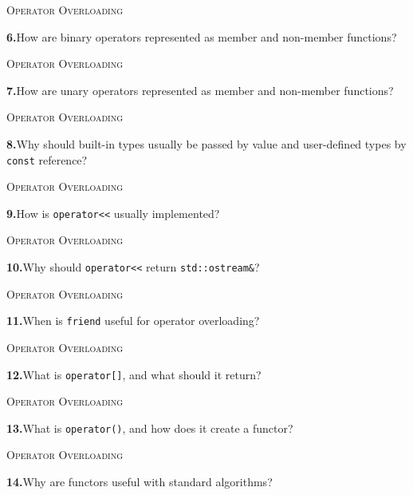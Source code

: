 \documentclass[11pt,a4paper]{article}
\newenvironment{questionblock}{%
  \begin{minipage}[t][0.455\textheight][t]{\textwidth}%
  \raggedright\small
}{%
  \vfill
  \end{minipage}%
}
\newcommand{\sectionlabel}[1]{\textsc{#1}\par\vspace{0.35em}}
\newcommand{\questionnumber}[1]{\textbf{#1.}\enspace}
\begin{document}
\begin{questionblock}
\sectionlabel{Operator Overloading}
\questionnumber{6}How are binary operators represented as member and non-member functions?\par
\end{questionblock}
\newpage
\begin{questionblock}
\sectionlabel{Operator Overloading}
\questionnumber{7}How are unary operators represented as member and non-member functions?\par
\end{questionblock}
\vspace*{0.04\textheight}
\begin{questionblock}
\sectionlabel{Operator Overloading}
\questionnumber{8}Why should built-in types usually be passed by value and user-defined types by \verb|const| reference?\par
\end{questionblock}
\newpage
\begin{questionblock}
\sectionlabel{Operator Overloading}
\questionnumber{9}How is \verb|operator<<| usually implemented?\par
\end{questionblock}
\vspace*{0.04\textheight}
\begin{questionblock}
\sectionlabel{Operator Overloading}
\questionnumber{10}Why should \verb|operator<<| return \verb|std::ostream&|?\par
\end{questionblock}
\newpage
\begin{questionblock}
\sectionlabel{Operator Overloading}
\questionnumber{11}When is \verb|friend| useful for operator overloading?\par
\end{questionblock}
\vspace*{0.04\textheight}
\begin{questionblock}
\sectionlabel{Operator Overloading}
\questionnumber{12}What is \verb|operator[]|, and what should it return?\par
\end{questionblock}
\newpage
\begin{questionblock}
\sectionlabel{Operator Overloading}
\questionnumber{13}What is \verb|operator()|, and how does it create a functor?\par
\end{questionblock}
\vspace*{0.04\textheight}
\begin{questionblock}
\sectionlabel{Operator Overloading}
\questionnumber{14}Why are functors useful with standard algorithms?\par

\end{questionblock}
\end{document}
